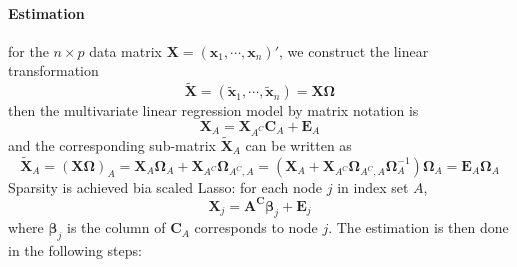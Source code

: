 \documentclass[twoside]{article}
\begin{document}
\paragraph*{Estimation} for the $n\times p$ data matrix $\mathbf{X}=\left(\mathbf{x}_1,\cdots,\mathbf{x}_n\right)'$, we construct the linear transformation $$ \tilde{\mathbf{X}} = \left( \tilde{\mathbf{x}}_1,\cdots,\tilde{\mathbf{x} }_n \right) = \mathbf{X}\boldsymbol{\Omega} $$
then the multivariate linear regression model by matrix notation is 
$$
\mathbf{X}_A = \mathbf{X}_{A^C}\mathbf{C}_A+\mathbf{E}_A
$$
and the corresponding sub-matrix $\tilde{\mathbf{X}}_A$ can be written as
$$
\tilde{\mathbf{X}}_A = (\mathbf{X}\boldsymbol{\Omega})_A = \mathbf{X}_A\boldsymbol{\Omega}_A + \mathbf{X}_{A^C}\boldsymbol{\Omega}_{A^C,A} = \left( \mathbf{X}_A+\mathbf{X}_{A^C}\boldsymbol{\Omega}_{A^C,A}\boldsymbol{\Omega}^{-1}_A \right)\boldsymbol{\Omega}_A = \mathbf{E}_A\boldsymbol{\Omega}_A
$$
Sparsity is achieved bia scaled Lasso: for each node $j$ in index set $A$, $$ \mathbf{X}_j = \mathbf{A^C}\boldsymbol{\beta}_j + \mathbf{E}_j $$ where $\boldsymbol{\beta}_j$ is the column of $\mathbf{C}_A$ corresponds to node $j$. The estimation is then done in the following steps:
\end{document}
